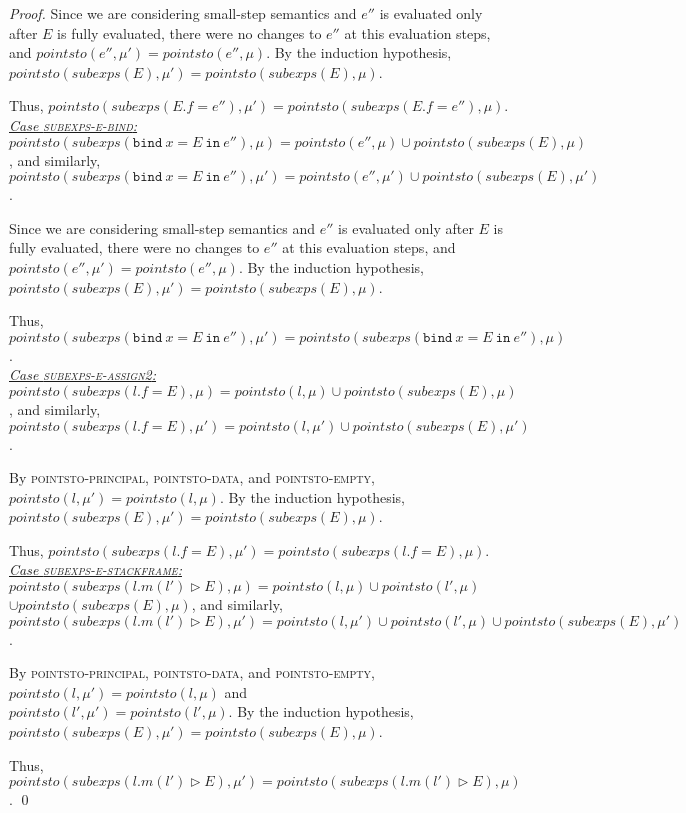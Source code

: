 \documentclass{llncs}
\newcommand{\keywadj}[1]{\mathtt{#1}}
\newcommand{\keyw}[1]{\keywadj{#1}~}
\begin{document}
\begin{proof}
Since we are considering small-step semantics and $e''$ is evaluated only after $E$ is fully evaluated, there were no changes to $e''$ at this evaluation steps, and $pointsto(e'', \mu') = pointsto(e'', \mu)$. By the induction hypothesis, $pointsto(subexps(E), \mu') = pointsto(subexps(E), \mu)$.

Thus, $pointsto(subexps(E.f = e''), \mu') =pointsto(subexps(E.f = e''), \mu)$.\\

\noindent\underline{\textit{Case \textsc{subexps-e-bind}:}} $pointsto(subexps(\keyw{bind} x = E~\keyw{in} e''), \mu) = pointsto(e'', \mu) \cup pointsto(subexps(E), \mu)$, and similarly, $pointsto(subexps(\keyw{bind} x = E~\keyw{in} e''), \mu') = pointsto(e'', \mu') \cup pointsto(subexps(E), \mu')$.

Since we are considering small-step semantics and $e''$ is evaluated only after $E$ is fully evaluated, there were no changes to $e''$ at this evaluation steps, and $pointsto(e'', \mu') = pointsto(e'', \mu)$. By the induction hypothesis, $pointsto(subexps(E), \mu') = pointsto(subexps(E), \mu)$.

Thus, $pointsto(subexps(\keyw{bind} x = E~\keyw{in} e''), \mu') =pointsto(subexps(\keyw{bind} x = E~\keyw{in} e''), \mu)$.\\

\noindent\underline{\textit{Case \textsc{subexps-e-assign2}:}} $pointsto(subexps(l.f = E), \mu) = pointsto(l, \mu) \cup pointsto(subexps(E), \mu)$, and similarly, $pointsto(subexps(l.f = E), \mu') = pointsto(l, \mu') \cup pointsto(subexps(E), \mu')$.

By \textsc{pointsto-principal}, \textsc{pointsto-data}, and \textsc{pointsto-empty}, $pointsto(l, \mu') = pointsto(l, \mu)$. By the induction hypothesis, $pointsto(subexps(E), \mu') = pointsto(subexps(E), \mu)$.

Thus, $pointsto(subexps(l.f = E), \mu') =pointsto(subexps(l.f = E), \mu)$.\\

\noindent\underline{\textit{Case \textsc{subexps-e-stackframe}:}} $pointsto(subexps(l.m(l') \rhd E), \mu) = pointsto(l, \mu) \cup pointsto(l', \mu)$\\
$\cup pointsto(subexps(E), \mu)$, and similarly, $pointsto(subexps(l.m(l') \rhd E), \mu') = pointsto(l, \mu') \cup pointsto(l', \mu) \cup pointsto(subexps(E), \mu')$.

By \textsc{pointsto-principal}, \textsc{pointsto-data}, and \textsc{pointsto-empty}, $pointsto(l, \mu') = pointsto(l, \mu)$ and\\
$pointsto(l', \mu') = pointsto(l', \mu)$. By the induction hypothesis, $pointsto(subexps(E), \mu') = pointsto(subexps(E), \mu)$.

Thus, $pointsto(subexps(l.m(l') \rhd E), \mu') =pointsto(subexps(l.m(l') \rhd E), \mu)$.
\qed
\end{proof}
\end{document}
